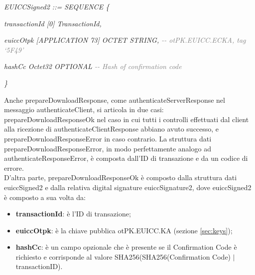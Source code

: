 \documentclass[10pt, oneside]{book}
\begin{document}
\textit{EUICCSigned2 ::= SEQUENCE \{}

\hspace{0.75cm} \textit{transactionId [0] TransactionId,}

\hspace{0.75cm} \textit{euiccOtpk [APPLICATION 73] OCTET STRING, \textcolor{gray}{{-}{-} otPK.EUICC.ECKA, tag `5F49'}}

\hspace{0.75cm} \textit{hashCc Octet32 OPTIONAL \textcolor{gray}{{-}{-} Hash of confirmation code}}

\textit{\}\\}

Anche prepareDownloadResponse, come authenticateServerResponse nel messaggio authenticateClient, si articola in due casi: prepareDownloadResponseOk nel caso in cui tutti i controlli effettuati dal client alla ricezione di authenticateClientResponse abbiano avuto successo, e prepareDownloadResponseError in caso contrario. La struttura dati prepareDownloadResponseError, in modo perfettamente analogo ad authenticateResponseError, è composta dall'ID di transazione e da un codice di errore.\\
D'altra parte, prepareDownloadResponseOk è composto dalla struttura dati euiccSigned2 e dalla relativa digital signature euiccSignature2, dove euiccSigned2 è composto a sua volta da:
\begin{itemize}
\item \textbf{transactionId}: è l'ID di transazione;
\item \textbf{euiccOtpk}: è la chiave pubblica otPK.EUICC.KA (sezione \ref{sec:keys});
\item \textbf{hashCc}: è un campo opzionale che è presente se il Confirmation Code è richiesto e corrisponde al valore SHA256(SHA256(Confirmation Code) $\vert$ transactionID).
\end{itemize}
\end{document}
